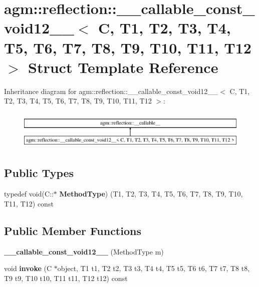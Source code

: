 \hypertarget{structagm_1_1reflection_1_1____callable__const__void12____}{}\section{agm\+:\+:reflection\+:\+:\+\_\+\+\_\+callable\+\_\+const\+\_\+void12\+\_\+\+\_\+$<$ C, T1, T2, T3, T4, T5, T6, T7, T8, T9, T10, T11, T12 $>$ Struct Template Reference}
\label{structagm_1_1reflection_1_1____callable__const__void12____}
Inheritance diagram for agm\+:\+:reflection\+:\+:\+\_\+\+\_\+callable\+\_\+const\+\_\+void12\+\_\+\+\_\+$<$ C, T1, T2, T3, T4, T5, T6, T7, T8, T9, T10, T11, T12 $>$\+:\begin{figure}[H]
\begin{center}
\leavevmode
\includegraphics[height=1.891892cm]{structagm_1_1reflection_1_1____callable__const__void12____}
\end{center}
\end{figure}
\subsection*{Public Types}
\begin{DoxyCompactItemize}
\item 
typedef void(C\+::$\ast$ {\bfseries Method\+Type}) (T1, T2, T3, T4, T5, T6, T7, T8, T9, T10, T11, T12) const \hypertarget{structagm_1_1reflection_1_1____callable__const__void12_____ab7706fe27f5054181fdf211191abfdb7}{}\label{structagm_1_1reflection_1_1____callable__const__void12_____ab7706fe27f5054181fdf211191abfdb7}

\end{DoxyCompactItemize}
\subsection*{Public Member Functions}
\begin{DoxyCompactItemize}
\item 
{\bfseries \+\_\+\+\_\+callable\+\_\+const\+\_\+void12\+\_\+\+\_\+} (Method\+Type m)\hypertarget{structagm_1_1reflection_1_1____callable__const__void12_____a5a31c13b0229366b2903aec9a9c8bfd6}{}\label{structagm_1_1reflection_1_1____callable__const__void12_____a5a31c13b0229366b2903aec9a9c8bfd6}

\item 
void {\bfseries invoke} (C $\ast$object, T1 t1, T2 t2, T3 t3, T4 t4, T5 t5, T6 t6, T7 t7, T8 t8, T9 t9, T10 t10, T11 t11, T12 t12) const \hypertarget{structagm_1_1reflection_1_1____callable__const__void12_____a2f4429ca46d0b9837e8c3a17d05a437c}{}\label{structagm_1_1reflection_1_1____callable__const__void12_____a2f4429ca46d0b9837e8c3a17d05a437c}

\end{DoxyCompactItemize}
